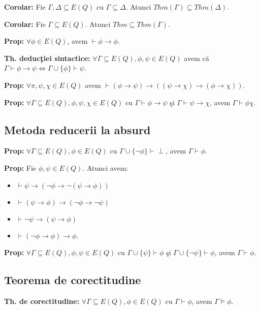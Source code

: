 \documentclass{article}
\begin{document}
\textbf{Corolar:} Fie $\Gamma,\Delta\subseteq E(Q)$ cu $\Gamma\subseteq\Delta$. Atunci $Thm(\Gamma)\subseteq Thm(\Delta)$.

\textbf{Corolar:} Fie $\Gamma\subseteq E(Q)$. Atunci $Thm\subseteq Thm(\Gamma)$.

\textbf{Prop:} $\forall\phi\in E(Q)$, avem $\vdash\phi\rightarrow\phi$.

\textbf{Th. deduc\c tiei sintactice:} $\forall \Gamma\subseteq E(Q),\phi,\psi\in E(Q)$ avem c\u a $\Gamma\vdash\phi\rightarrow\psi\iff\Gamma\cup\{\phi\}\vdash\psi$.

\textbf{Prop:} $\forall \pi,\psi,\chi\in E(Q)$ avem $\vdash(\phi\rightarrow\psi)\rightarrow((\psi\rightarrow\chi)\rightarrow(\phi\rightarrow\chi))$.

\textbf{Prop:} $\forall\Gamma\subseteq E(Q),\phi,\psi,\chi\in E(Q)$ cu $\Gamma\vdash\phi\rightarrow\psi$ \c si $\Gamma\vdash\psi\rightarrow\chi$, avem $\Gamma\vdash\phi\chi$.

\subsection{Metoda reducerii la absurd}

\textbf{Prop:} $\forall \Gamma\subseteq E(Q),\phi\in E(Q)$ cu $\Gamma\cup\{\neg\phi\}\vdash\perp$, avem $\Gamma\vdash\phi$.

\textbf{Prop:} Fie $\phi,\psi \in E(Q)$. Atunci avem:
\begin{itemize}
    \item $\vdash\psi\rightarrow(\neg\phi\rightarrow\neg(\psi\rightarrow\phi))$
    \item $\vdash (\psi\rightarrow\phi)\rightarrow(\neg\phi\rightarrow\neg\psi)$
    \item $\vdash\neg\psi\rightarrow(\psi\rightarrow\phi)$
    \item $\vdash(\neg\phi\rightarrow\phi)\rightarrow\phi$.
\end{itemize}

\textbf{Prop:} $\forall \Gamma\subseteq E(Q),\phi,\psi\in E(Q)$ cu $\Gamma\cup\{\psi\}\vdash\phi$ \c si $\Gamma\cup \{\neg\psi\}\vdash\phi$, avem $\Gamma\vdash\phi$.

\subsection{Teorema de corectitudine}

\textbf{Th. de corectitudine:} $\forall \Gamma\subseteq E(Q),\phi\in E(Q)$ cu $\Gamma\vdash\phi$, avem $\Gamma\models\phi$.
\end{document}
